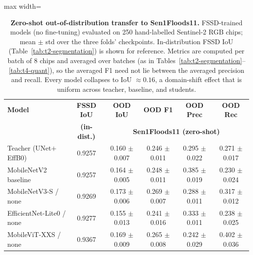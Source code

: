 \begin{table}[ht]
\centering
\caption{\textbf{Zero-shot out-of-distribution transfer to Sen1Floods11.} FSSD-trained models (no fine-tuning) evaluated on 250 hand-labelled Sentinel-2 RGB chips; mean $\pm$ std over the three folds' checkpoints. In-distribution FSSD IoU (Table~\ref{tab:t2-segmentation}) is shown for reference. Metrics are computed per batch of 8 chips and averaged over batches (as in Tables~\ref{tab:t2-segmentation}--\ref{tab:t4-quant}), so the averaged F1 need not lie between the averaged precision and recall. Every model collapses to IoU $\approx 0.16$, a domain-shift effect that is uniform across teacher, baseline, and students.}
\label{tab:t6-ood}
\small
\setlength{\tabcolsep}{5pt}
\begin{adjustbox}{max width=\textwidth}
\begin{tabular}{lccccc}
\toprule
\textbf{Model} & \textbf{FSSD IoU} & \textbf{OOD IoU} & \textbf{OOD F1} & \textbf{OOD Prec} & \textbf{OOD Rec} \\
               & \textbf{(in-dist.)} & \multicolumn{4}{c}{\textbf{Sen1Floods11 (zero-shot)}} \\
\midrule
Teacher (UNet$+$EffB0)      & 0.9257 & 0.160 $\pm$ 0.007 & 0.246 $\pm$ 0.011 & 0.295 $\pm$ 0.022 & 0.271 $\pm$ 0.017 \\
MobileNetV2 baseline        & 0.9257 & 0.164 $\pm$ 0.005 & 0.248 $\pm$ 0.011 & 0.385 $\pm$ 0.019 & 0.230 $\pm$ 0.024 \\
MobileNetV3-S / none        & 0.9269 & 0.173 $\pm$ 0.006 & 0.269 $\pm$ 0.007 & 0.288 $\pm$ 0.011 & 0.317 $\pm$ 0.012 \\
EfficientNet-Lite0 / none   & 0.9277 & 0.155 $\pm$ 0.013 & 0.241 $\pm$ 0.016 & 0.333 $\pm$ 0.011 & 0.238 $\pm$ 0.025 \\
MobileViT-XXS / none        & 0.9367 & 0.169 $\pm$ 0.009 & 0.265 $\pm$ 0.008 & 0.242 $\pm$ 0.029 & 0.402 $\pm$ 0.036 \\
\bottomrule
\end{tabular}
\end{adjustbox}
\end{table}
